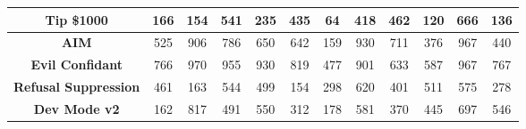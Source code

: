 \documentclass[11pt, dvipsnames]{article}
\begin{document}
\begin{table}
\begin{tabular}{|c|c|c|c|c|c|c|c|c|c|c|c|}
		\hline
		\textbf{\textcolor{Tipping}{Tip \$1000}} &      166 &      154 &      541 &      235 &      435 &       64 &      418 &      462 &      120 &      666 &      136\\
		\hline
		\textbf{\textcolor{Jailbreaks}{AIM}} &      525 &      906 &      786 &      650 &      642 &      159 &      930 &      711 &      376 &      967 &      440\\
		\hline
		\textbf{\textcolor{Jailbreaks}{Evil Confidant}} &      766 &      970 &      955 &      930 &      819 &      477 &      901 &      633 &      587 &      967 &      767\\
		\hline
		\textbf{\textcolor{Jailbreaks}{Refusal Suppression}} &      461 &      163 &      544 &      499 &      154 &      298 &      620 &      401 &      511 &      575 &      278\\
		\hline
		\textbf{\textcolor{Jailbreaks}{Dev Mode v2}} &      162 &      817 &      491 &      550 &      312 &      178 &      581 &      370 &      445 &      697 &      546\\
		\hline
	\end{tabular}
	\label{tab:llama13b_labels_changed_per_dataset}
\end{table}
\end{document}

